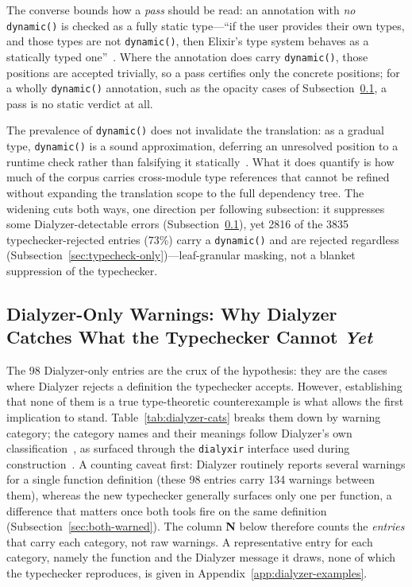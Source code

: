 The converse bounds how a \emph{pass} should be read: an annotation with \emph{no} \texttt{dynamic()} is checked as a fully static type---``if the user provides their own types, and those types are not \texttt{dynamic()}, then Elixir's type system behaves as a statically typed one''~\cite{elixir-set-theoretic-types}.
Where the annotation does carry \texttt{dynamic()}, those positions are accepted trivially, so a pass certifies only the concrete positions; for a wholly \texttt{dynamic()} annotation, such as the opacity cases of Subsection~\ref{sec:dialyzer-only}, a pass is no static verdict at all.

The prevalence of \texttt{dynamic()} does not invalidate the translation: as a gradual type, \texttt{dynamic()} is a sound approximation, deferring an unresolved position to a runtime check rather than falsifying it statically~\cite{duboc2024}. What it does quantify is how much of the corpus carries cross-module type references that cannot be refined without expanding the translation scope to the full dependency tree.
The widening cuts both ways, one direction per following subsection: it suppresses some Dialyzer-detectable errors (Subsection~\ref{sec:dialyzer-only}), yet \num{2816} of the \num{3835} typechecker-rejected entries (73\%) carry a \texttt{dynamic()} and are rejected regardless (Subsection~\ref{sec:typecheck-only})---leaf-granular masking, not a blanket suppression of the typechecker.

\subsection{Dialyzer-Only Warnings: Why Dialyzer Catches What the Typechecker Cannot \emph{Yet}}
\label{sec:dialyzer-only}

The 98 Dialyzer-only entries are the crux of the hypothesis: they are the cases where Dialyzer rejects a definition the typechecker accepts.
However, establishing that none of them is a true type-theoretic counterexample is what allows the first implication to stand.
Table~\ref{tab:dialyzer-cats} breaks them down by warning category; the category names and their meanings follow Dialyzer's own classification~\cite{dialyzer-manual}, as surfaced through the \texttt{dialyxir} interface used during construction~\cite{dialyxir}.
A counting caveat first: Dialyzer routinely reports several warnings for a single function definition (these 98 entries carry 134 warnings between them), whereas the new typechecker generally surfaces only one per function, a difference that matters once both tools fire on the same definition (Subsection~\ref{sec:both-warned}).
The column \textbf{N} below therefore counts the \emph{entries} that carry each category, not raw warnings.
A representative entry for each category, namely the function and the Dialyzer message it draws, none of which the typechecker reproduces, is given in Appendix~\ref{app:dialyzer-examples}.

